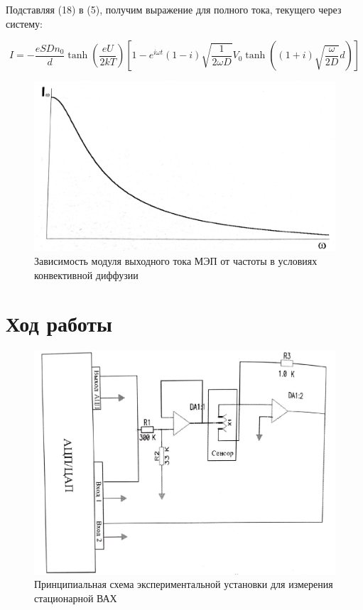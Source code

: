\documentclass[a4paper,12pt]{article}
\begin{document}
\newpage

Подставляя (18) в (5), получим выражение для полного тока, текущего через систему:

\begin{equation}
I=-\frac{e S D n_{0}}{d} \tanh \left(\frac{e U}{2 k T}\right)\left[1-e^{i \omega t}(1-i) \sqrt{\frac{1}{2 \omega D}} V_{0} \tanh \left((1+i) \sqrt{\frac{\omega}{2 D}} d\right)\right]
\end{equation}

\begin{figure}[h]
	\begin{center}
		\includegraphics[scale=0.5]{fig4}
		\caption{Зависимость модуля выходного тока МЭП от частоты в условиях конвективной диффузии}
		\label{Module}
	\end{center}
\end{figure}

\section{Ход работы}

\begin{figure}[h!]
	\begin{center}
		\includegraphics[scale=0.4]{fig5}
		\caption{Принципиальная схема экспериментальной установки для измерения стационарной ВАХ}
		\label{scheme}
	\end{center}
\end{figure}
\end{document}
